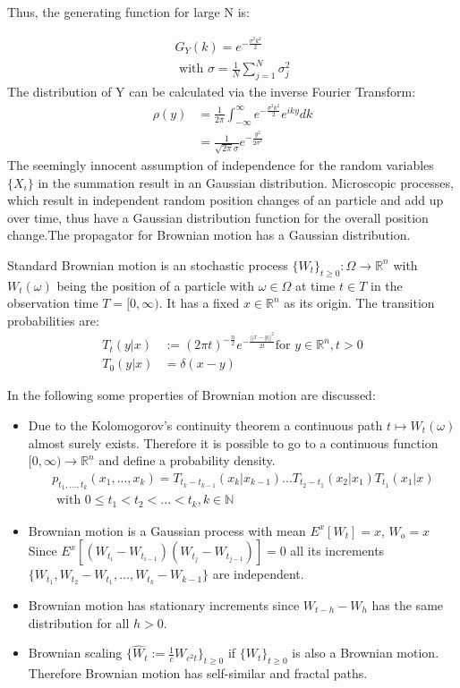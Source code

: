 \documentclass[
  a4paper,BCOR10mm,oneside,
  bibtotoc,idxtotoc,
  headsepline,footsepline,%
  fleqn,openbib
]{scrbook}
\begin{document}
Thus, the generating function for large N is:

\begin{align}
 G_Y(k)=e^{- \frac{\sigma^2 k^2}{2}} \\ \nonumber
 \text{ with } \sigma =  \frac{1}{N} \sum_{j=1}^N \sigma_j^2 
\end{align}
The distribution of Y can be calculated via the inverse Fourier Transform:
\begin{align}
 \rho(y) &=\frac{1}{2 \pi} \int_{-\infty}^{\infty} e^{- \frac{\sigma^2 k^2}{2}} e^{i k y} dk \\  
 &=\frac{1}{\sqrt{2 \pi} \sigma } e^{-\frac{y^2}{2 \sigma^2}}
\end{align}
The seemingly innocent assumption of independence for the random variables $\{X_i\}$ in the summation result in an Gaussian distribution. Microscopic processes, which result in independent random position changes of an particle and add up over time, thus have a Gaussian distribution function for the overall position change.The propagator for Brownian motion has a Gaussian distribution.
\begin{mydef}
Standard Brownian motion is an stochastic process $ \{ W_t \}_{t\geq0}: \Omega \rightarrow \mathbb{R}^n$ with $ W_t(\omega)$ being the position of a particle with $\omega \in \Omega$ at time $t \in T$ in the observation time $T =[0, \infty)$. It has a fixed $x \in \mathbb{R}^n$ as its origin. The transition probabilities are: 
\begin{align}
T_{t}(y|x) & := (2 \pi t)^{- \frac{n}{2}} e^{- \frac{||x-y||^2}{2 t}} \text{for } y \in \mathbb{R}^n, t>0 \\ \nonumber
T_{0}(y|x) & = \delta(x-y) 
\end{align}
\end{mydef}
In the following some properties of Brownian motion are discussed:\\
\begin{itemize}
 \item Due to the Kolomogorov's continuity theorem a continuous path $ t \mapsto W_t(\omega)$ almost surely exists. Therefore it is possible to go to a continuous function $[0,\infty) \rightarrow \mathbb{R}^n$ and define a probability density.
\begin{align*}
p_{t_1,...,t_k}(x_1,...,x_k)  =T_{t_k -t_{k-1}}(x_k|x_{k-1}) ... T_{t_2 - t_1}(x_2|x_1) T_{t_1}(x_1|x)  \\
\text{ with }  0\leq t_1 < t_2 < ...< t_k,k \in \mathbb{N}
\end{align*}
\item Brownian motion is a Gaussian process with mean $E^x[W_t]=x$, $W_o=x$ 
Since $ E^x[(W_{t_i}-W_{t_{i-1}})(W_{t_j}-W_{t_{j-1}})]=0 $  all its increments $\{W_{t_1},W_{t_2}-W_{t_1},...,W_{t_k}-W_{k-1}\}$ are independent.

\item Brownian motion has stationary increments since ${W_{t-h}-W_{h}}$ has the same distribution for all $h>0$.

\item Brownian scaling $\{\hat{W}_t := \frac{1}{c} W_{c^2 t} \}_{t\geq0}$ if $\{W_t\}_{t \geq 0}$  is also a Brownian motion. Therefore Brownian motion has self-similar and fractal paths.
\end{itemize}
\end{document}
